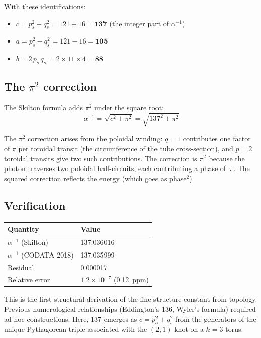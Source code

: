 \documentclass[11pt,a4paper]{article}
\begin{document}
With these identifications:
\begin{itemize}
  \item $c = p_s^2 + q_s^2 = 121 + 16 = \mathbf{137}$ (the integer part of $\alpha^{-1}$)
  \item $a = p_s^2 - q_s^2 = 121 - 16 = \mathbf{105}$
  \item $b = 2\,p_s\,q_s = 2 \times 11 \times 4 = \mathbf{88}$
\end{itemize}

\subsection{The $\pi^2$ correction}

The Skilton formula adds $\pi^2$ under the square root:
\begin{equation}
  \alpha^{-1} = \sqrt{c^2 + \pi^2} = \sqrt{137^2 + \pi^2}
\end{equation}

The $\pi^2$ correction arises from the poloidal winding: $q = 1$ contributes one factor of $\pi$ per toroidal transit (the circumference of the tube cross-section), and $p = 2$ toroidal transits give two such contributions. The correction is $\pi^2$ because the photon traverses two poloidal half-circuits, each contributing a phase of~$\pi$. The squared correction reflects the energy (which goes as phase$^2$).

\subsection{Verification}

\begin{table}[h]
\centering
\begin{tabular}{@{}ll@{}}
\toprule
Quantity & Value \\
\midrule
$\alpha^{-1}$ (Skilton) & 137.036016 \\
$\alpha^{-1}$ (CODATA 2018) & 137.035999 \\
Residual & 0.000017 \\
Relative error & $1.2 \times 10^{-7}$ (0.12~ppm) \\
\bottomrule
\end{tabular}
\end{table}

This is the first structural derivation of the fine-structure constant from topology. Previous numerological relationships (Eddington's 136, Wyler's formula) required ad hoc constructions. Here, 137 emerges as $c = p_s^2 + q_s^2$ from the generators of the unique Pythagorean triple associated with the $(2,1)$ knot on a $k=3$ torus.
\end{document}
